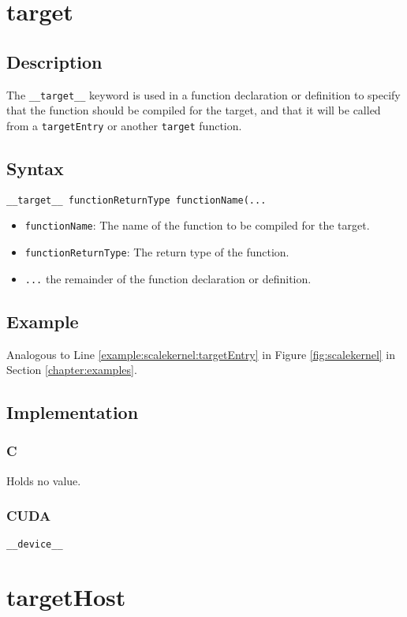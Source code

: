 \newpage
\section{target}
\subsection{Description}

The \verb+__target__+ keyword is used in a function declaration
or definition to specify that the function should be compiled for the
target, and that it will be called from a \verb+targetEntry+ or another \verb+target+ function.

\subsection{Syntax}
\begin{verbatim}
__target__ functionReturnType functionName(...
\end{verbatim}

\begin{itemize}
\item \verb+functionName+: The name of the function to be compiled for the target.
\item \verb+functionReturnType+: The return type of the function.
\item \verb+...+ the remainder of the function declaration or definition.
\end{itemize}


\subsection{Example}
Analogous to Line \ref{example:scalekernel:targetEntry} in Figure \ref{fig:scalekernel} in Section \ref{chapter:examples}.

\subsection{Implementation}
\subsubsection{C}
Holds no value.
\subsubsection{CUDA}
\verb+__device__+


\newpage
\section{targetHost}
